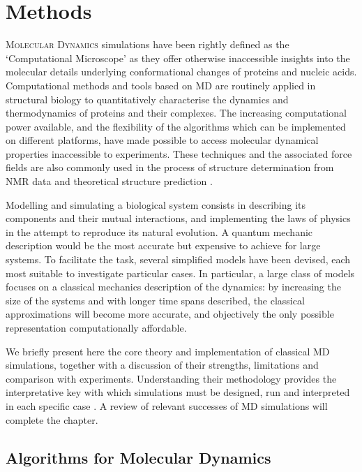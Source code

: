 \chapter{Methods} \label{chapter:MD}

\lettrine{M}{olecular Dynamics} simulations have been rightly defined as the `Computational Microscope' \citep{Lee2009,Dror2012} as they offer otherwise inaccessible insights into the molecular details underlying conformational changes of proteins and nucleic acids. Computational methods and tools based on MD are routinely applied in structural biology to quantitatively characterise the dynamics and thermodynamics of proteins and their complexes. The increasing computational power available, and the flexibility of the algorithms which can be implemented on different platforms, have made possible to access molecular dynamical properties inaccessible to experiments. These techniques and the associated force fields are also commonly used in the process of structure determination from NMR data and theoretical structure prediction \citep{Vogel2017,Heo2018}.

Modelling and simulating a biological system consists in describing its components and their mutual interactions, and implementing the laws of physics in the attempt to reproduce its natural evolution. A quantum mechanic description would be the most accurate but expensive to achieve for large systems. To facilitate the task, several simplified models have been devised, each most suitable to investigate particular cases.
%
In particular, a large class of models focuses on a classical mechanics description of the dynamics: by increasing the size of the systems and with longer time spans described, the classical approximations will become more accurate, and objectively the only possible representation computationally affordable.

We briefly present here the core theory and implementation of classical MD simulations, together with a discussion of their strengths, limitations and comparison with experiments. Understanding their methodology provides the interpretative key with which simulations must be designed, run and interpreted in each specific case \citep{vanGunsteren2006}. A review of relevant successes of MD simulations will complete the chapter.


\section{Algorithms for Molecular Dynamics}

